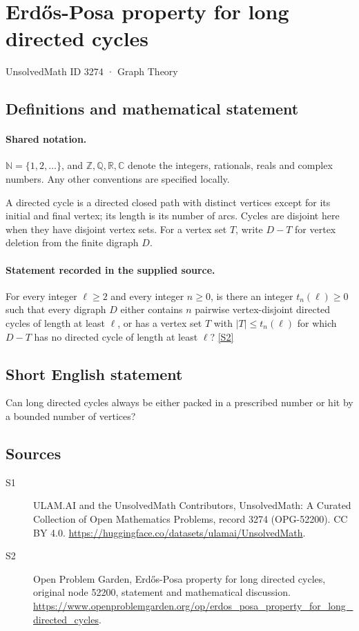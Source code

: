 \documentclass[11pt]{article}
\newcommand{\sref}[2]{\hyperlink{source:#1:#2}{[S#2]}}
\begin{document}
\setcounter{section}{3273}
\section{Erdős-Posa property for long directed cycles}\label{3274}
{\small\sffamily UnsolvedMath ID 3274 · Graph Theory}
\subsection{Definitions and mathematical statement}

\paragraph{Shared notation.}$\mathbb N=\{1,2,\ldots\}$, and $\mathbb Z,\mathbb Q,\mathbb R,\mathbb C$ denote the integers, rationals, reals and complex numbers. Any other conventions are specified locally.


A directed cycle is a directed closed path with distinct vertices except for its initial and final vertex; its length is its number of arcs. Cycles are disjoint here when they have disjoint vertex sets. For a vertex set $T$, write $D-T$ for vertex deletion from the finite digraph $D$.
\paragraph{Statement recorded in the supplied source.}
For every integer $\ell\ge2$ and every integer $n\ge0$, is there an integer $t_n(\ell)\ge0$ such that every digraph $D$ either contains $n$ pairwise vertex-disjoint directed cycles of length at least $\ell$, or has a vertex set $T$ with $|T|\le t_n(\ell)$ for which $D-T$ has no directed cycle of length at least $\ell$? \sref{3274}{2}
\subsection{Short English statement}
Can long directed cycles always be either packed in a prescribed number or hit by a bounded number of vertices?
\subsection{Sources}
\begin{description}
\item[\hypertarget{source:3274:1}{S1}] ULAM.AI and the UnsolvedMath Contributors, UnsolvedMath: A Curated Collection of Open Mathematics Problems, record 3274 (OPG-52200). CC BY 4.0. \url{https://huggingface.co/datasets/ulamai/UnsolvedMath}.
\item[\hypertarget{source:3274:2}{S2}] Open Problem Garden, Erdős-Posa property for long directed cycles, original node 52200, statement and mathematical discussion. \url{https://www.openproblemgarden.org/op/erdos_posa_property_for_long_directed_cycles}.
\end{description}
\label{end:3274}
\end{document}
